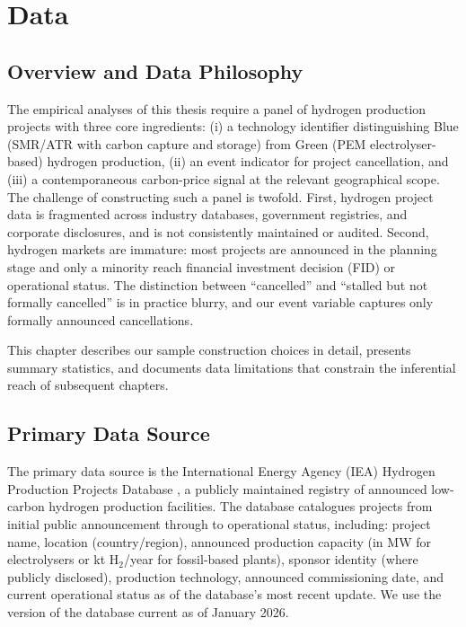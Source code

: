 \chapter{Data}
\label{ch:data}
\section{Overview and Data Philosophy}
\label{sec:ch4-overview}

The empirical analyses of this thesis require a panel of hydrogen production projects with three core ingredients: (i) a technology identifier distinguishing Blue (SMR/ATR with carbon capture and storage) from Green (PEM electrolyser-based) hydrogen production, (ii) an event indicator for project cancellation, and (iii) a contemporaneous carbon-price signal at the relevant geographical scope. The challenge of constructing such a panel is twofold. First, hydrogen project data is fragmented across industry databases, government registries, and corporate disclosures, and is not consistently maintained or audited. Second, hydrogen markets are immature: most projects are announced in the planning stage and only a minority reach financial investment decision (FID) or operational status. The distinction between ``cancelled'' and ``stalled but not formally cancelled'' is in practice blurry, and our event variable captures only formally announced cancellations.

This chapter describes our sample construction choices in detail, presents summary statistics, and documents data limitations that constrain the inferential reach of subsequent chapters.

\section{Primary Data Source}
\label{sec:ch4-source}

The primary data source is the International Energy Agency (IEA) Hydrogen Production Projects Database \cite{iea2024hydrogenprojects}, a publicly maintained registry of announced low-carbon hydrogen production facilities. The database catalogues projects from initial public announcement through to operational status, including: project name, location (country/region), announced production capacity (in MW for electrolysers or kt H$_2$/year for fossil-based plants), sponsor identity (where publicly disclosed), production technology, announced commissioning date, and current operational status as of the database's most recent update. We use the version of the database current as of January 2026.

